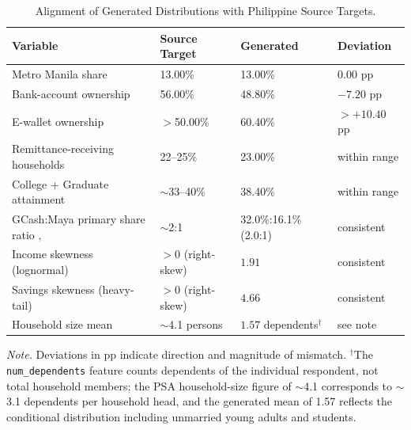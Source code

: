 \documentclass[journal]{./IEEE/IEEEtran}
\begin{document}
\begin{table}[h]
    \centering
    \caption{Alignment of Generated Distributions with Philippine Source Targets.}
    \label{tab:alignment}
    \footnotesize
    \begin{tabular}{|p{2cm}|p{1.5cm}|p{1.5cm}|p{1.5cm}|}
        \hline
        \textbf{Variable} & \textbf{Source Target} & \textbf{Generated} & \textbf{Deviation} \\
        \hline
        Metro Manila \newline share \cite{ref39} & 13.00\% & 13.00\% & $0.00$ pp \\
        Bank-account \newline ownership \cite{ref35} & 56.00\% & 48.80\% & $-7.20$ pp \\
        E-wallet \newline ownership \cite{ref35} & $>$50.00\% & 60.40\% & $>+10.40$ pp \\
        Remittance-receiving households \cite{ref40} & 22--25\% & 23.00\% & within range \\
        College + Graduate attainment \cite{ref39} & $\sim$33--40\% & 38.40\% & within range \\
        GCash:Maya primary share ratio \cite{ref9}, \cite{ref35} & $\sim$2:1 & 32.0\%:16.1\% (2.0:1) & consistent \\
        Income skewness \newline (lognormal) \cite{ref54} & $>0$ (right-skew) & $1.91$ & consistent \\
        Savings skewness (heavy-tail) \cite{ref55} & $>0$ (right-skew) & $4.66$ & consistent \\
        Household size \newline mean \cite{ref39} & $\sim$4.1 persons & $1.57$ dependents$^\dagger$ & see note \\
        \hline
    \end{tabular}

    \vspace{0.5em}
    \raggedright\scriptsize \emph{Note.} Deviations in pp indicate direction and magnitude of mismatch. $^\dagger$The \texttt{num\_dependents} feature counts dependents of the individual respondent, not total household members; the PSA household-size figure of $\sim$4.1 corresponds to $\sim$3.1 dependents per household head, and the generated mean of 1.57 reflects the conditional distribution including unmarried young adults and students.
\end{table}
\end{document}

